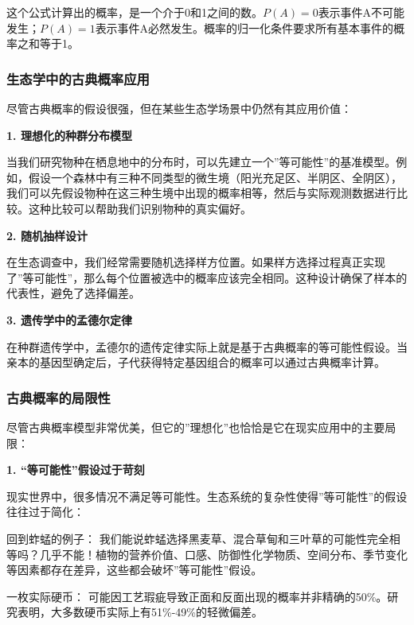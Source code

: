\documentclass[
]{book}
\begin{document}
这个公式计算出的概率，是一个介于0和1之间的数。\(P(A)=0\)表示事件A不可能发生；\(P(A)=1\)表示事件A必然发生。概率的归一化条件要求所有基本事件的概率之和等于1。

\hypertarget{ux751fux6001ux5b66ux4e2dux7684ux53e4ux5178ux6982ux7387ux5e94ux7528}{%
\subsubsection{生态学中的古典概率应用}\label{ux751fux6001ux5b66ux4e2dux7684ux53e4ux5178ux6982ux7387ux5e94ux7528}}

尽管古典概率的假设很强，但在某些生态学场景中仍然有其应用价值：

\textbf{1. 理想化的种群分布模型}

当我们研究物种在栖息地中的分布时，可以先建立一个''等可能性''的基准模型。例如，假设一个森林中有三种不同类型的微生境（阳光充足区、半阴区、全阴区），我们可以先假设物种在这三种生境中出现的概率相等，然后与实际观测数据进行比较。这种比较可以帮助我们识别物种的真实偏好。

\textbf{2. 随机抽样设计}

在生态调查中，我们经常需要随机选择样方位置。如果样方选择过程真正实现了''等可能性''，那么每个位置被选中的概率应该完全相同。这种设计确保了样本的代表性，避免了选择偏差。

\textbf{3. 遗传学中的孟德尔定律}

在种群遗传学中，孟德尔的遗传定律实际上就是基于古典概率的等可能性假设。当亲本的基因型确定后，子代获得特定基因组合的概率可以通过古典概率计算。

\hypertarget{ux53e4ux5178ux6982ux7387ux7684ux5c40ux9650ux6027}{%
\subsubsection{古典概率的局限性}\label{ux53e4ux5178ux6982ux7387ux7684ux5c40ux9650ux6027}}

尽管古典概率模型非常优美，但它的''理想化''也恰恰是它在现实应用中的主要局限：

\textbf{1. ``等可能性''假设过于苛刻}

现实世界中，很多情况不满足等可能性。生态系统的复杂性使得''等可能性''的假设往往过于简化：

回到蚱蜢的例子： 我们能说蚱蜢选择黑麦草、混合草甸和三叶草的可能性完全相等吗？几乎不能！植物的营养价值、口感、防御性化学物质、空间分布、季节变化等因素都存在差异，这些都会破坏''等可能性''假设。

一枚实际硬币： 可能因工艺瑕疵导致正面和反面出现的概率并非精确的50\%。研究表明，大多数硬币实际上有51\%-49\%的轻微偏差。
\end{document}

